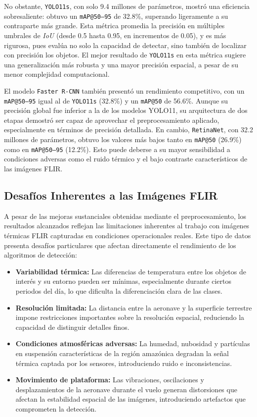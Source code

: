 No obstante, \texttt{YOLO11s}, con solo 9.4 millones de parámetros, mostró una eficiencia sobresaliente: obtuvo un \texttt{mAP@50--95} de 32.8\%, superando ligeramente a su contraparte más grande. Esta métrica promedia la precisión en múltiples umbrales de \textit{IoU} (desde 0.5 hasta 0.95, en incrementos de 0.05), y es más rigurosa, pues evalúa no solo la capacidad de detectar, sino también de localizar con precisión los objetos. El mejor resultado de \texttt{YOLO11s} en esta métrica sugiere una generalización más robusta y una mayor precisión espacial, a pesar de su menor complejidad computacional.

El modelo \texttt{Faster R-CNN} también presentó un rendimiento competitivo, con un \texttt{mAP@50--95} igual al de \texttt{YOLO11s} (32.8\%) y un \texttt{mAP@50} de 56.6\%. Aunque su precisión global fue inferior a la de los modelos YOLO11, su arquitectura de dos etapas demostró ser capaz de aprovechar el preprocesamiento aplicado, especialmente en términos de precisión detallada. En cambio, \texttt{RetinaNet}, con 32.2 millones de parámetros, obtuvo los valores más bajos tanto en \texttt{mAP@50} (26.9\%) como en \texttt{mAP@50--95} (12.2\%). Esto puede deberse a su mayor sensibilidad a condiciones adversas como el ruido térmico y el bajo contraste característicos de las imágenes FLIR.

\subsection{Desafíos Inherentes a las Imágenes FLIR}

A pesar de las mejoras sustanciales obtenidas mediante el preprocesamiento, los resultados alcanzados reflejan las limitaciones inherentes al trabajo con imágenes térmicas FLIR capturadas en condiciones operacionales reales. Este tipo de datos presenta desafíos particulares que afectan directamente el rendimiento de los algoritmos de detección:

\begin{itemize}
    \item \textbf{Variabilidad térmica:} Las diferencias de temperatura entre los objetos de interés y su entorno pueden ser mínimas, especialmente durante ciertos periodos del día, lo que dificulta la diferenciación clara de las clases.
    \item \textbf{Resolución limitada:} La distancia entre la aeronave y la superficie terrestre impone restricciones importantes sobre la resolución espacial, reduciendo la capacidad de distinguir detalles finos.
    \item \textbf{Condiciones atmosféricas adversas:} La humedad, nubosidad y partículas en suspensión características de la región amazónica degradan la señal térmica captada por los sensores, introduciendo ruido e inconsistencias.
    \item \textbf{Movimiento de plataforma:} Las vibraciones, oscilaciones y desplazamientos de la aeronave durante el vuelo generan distorsiones que afectan la estabilidad espacial de las imágenes, introduciendo artefactos que comprometen la detección.
\end{itemize}

